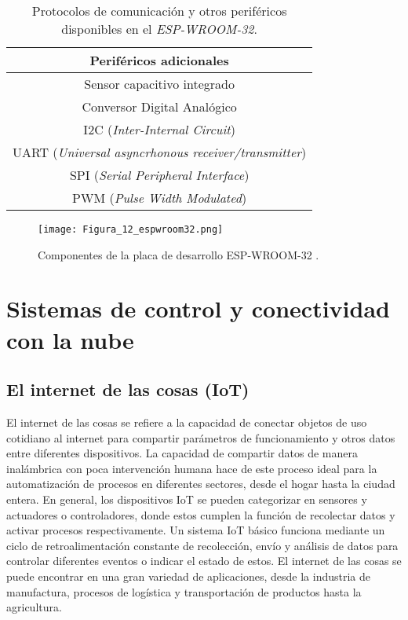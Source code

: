 \begin{table}[H]
	\centering
	\begin{tabular}{|c|c|}
		\hline
		\multicolumn{2}{|c|}{\textbf{Periféricos adicionales}}\\ \hline
		\multicolumn{2}{|c|}{Sensor capacitivo integrado}\\ \hline
		\multicolumn{2}{|c|}{Conversor Digital Analógico}\\ \hline
		\multicolumn{2}{|c|}{I2C (\textit{Inter-Internal Circuit})}\\ \hline
		\multicolumn{2}{|c|}{UART (\textit{Universal asyncrhonous receiver/transmitter})}\\ \hline
		\multicolumn{2}{|c|}{SPI (\textit{Serial Peripheral Interface})}\\ \hline
		\multicolumn{2}{|c|}{PWM (\textit{Pulse Width Modulated})}\\ \hline
	\end{tabular}
	\caption{Protocolos de comunicación y otros periféricos disponibles en el \textit{ESP-WROOM-32}.}
	\label{Cuadro7}
\end{table}

\begin{figure}[H]
	\centering
	\texttt{[image: Figura\_12\_espwroom32.png]}
	\caption{Componentes de la placa de desarrollo ESP-WROOM-32 \cite{electronic_wings_espwroom32}.}
	\label{fig:mesh12}
\end{figure}

\section{Sistemas de control y conectividad con la nube}

\subsection{El internet de las cosas (IoT)}
El internet de las cosas se refiere a la capacidad de conectar objetos de uso cotidiano al internet para compartir parámetros de funcionamiento y otros datos entre diferentes dispositivos. La capacidad de compartir datos de manera inalámbrica con poca intervención humana hace de este proceso ideal para la automatización de procesos en diferentes sectores, desde el hogar hasta la ciudad entera. En general, los dispositivos IoT se pueden categorizar en sensores y actuadores o controladores, donde estos cumplen la función de recolectar datos y activar procesos respectivamente. Un sistema IoT básico funciona mediante un ciclo de retroalimentación constante de recolección, envío y análisis de datos para controlar diferentes eventos o indicar el estado de estos. El internet de las cosas se puede encontrar en una gran variedad de aplicaciones, desde la industria de manufactura, procesos de logística y transportación de productos hasta la agricultura. \cite{redhat_IoT_2019}

